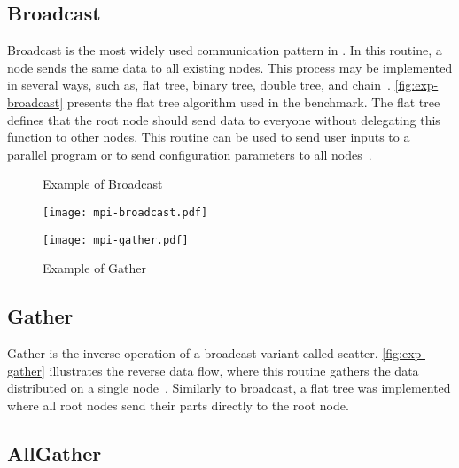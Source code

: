 		\subsection{Broadcast}

			Broadcast is the most widely used communication pattern
			in \mpi. In this routine, a node sends the same data to
			all existing nodes. This process may be implemented in several ways,
			such as, flat tree, binary tree, double tree, and chain~\cite{mpi-survey}.
			\autoref{fig:exp-broadcast} presents the flat tree algorithm used in
			the benchmark. The flat tree defines that the root node should send
			data to everyone without delegating this function to other nodes.
			This routine can be used to send user inputs to a parallel program
			or to send configuration parameters to all nodes~\cite{url:mpitutorial}.

			\begin{figure}[!tb]
				\centering

				\begin{minipage}{.4\textwidth}
					\centering%
					\caption{Example of \mpi Broadcast}%
					\label{fig:exp-broadcast}%
					\texttt{[image: mpi-broadcast.pdf]}%
				\end{minipage}%
				\hspace{1cm}%
				\begin{minipage}{.4\textwidth}
					\centering%
					\caption{Example of \mpi Gather}%
					\label{fig:exp-gather}%
					\texttt{[image: mpi-gather.pdf]}%
				\end{minipage}%

			\end{figure}

		\subsection{Gather}

			Gather is the inverse operation of a broadcast variant called scatter.
			\autoref{fig:exp-gather} illustrates the reverse data flow, where this
			routine gathers the data distributed on a single node~\cite{url:mpitutorial}.
			Similarly to broadcast, a flat tree was implemented where all root
			nodes send their parts directly to the root node.

		\subsection{AllGather}

